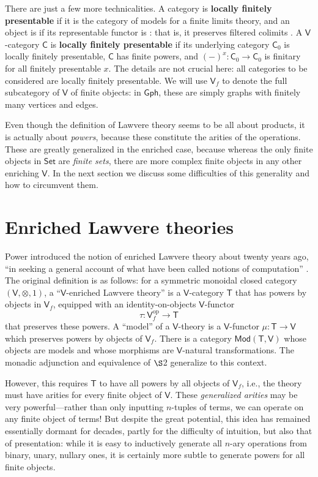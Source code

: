 \documentclass{amsart}
\newcommand{\define}[1]{{\bf \boldmath{#1}}}
\theoremstyle{definition}
\newcommand{\Gph}{\mathsf{Gph}}
\newcommand{\Set}{\mathsf{Set}}
\newcommand{\Mod}{\mathsf{Mod}}
\newcommand{\V}{\mathsf{V}}
\newcommand{\C}{\mathsf{C}}
\newcommand{\T}{\mathsf{T}}
\newcommand{\op}{\mathrm{op}}
\newcommand{\maps}{\colon}
\begin{document}
There are just a few more technicalities. A category is \textbf{locally finitely presentable} if it is the category of models for a finite limits theory, and an object is \define{finite} if its representable functor is \define{finitary}: that is, it preserves filtered colimits \cite{adamekrosicky}.   A $\V$-category $\C$ is \textbf{locally finitely presentable} if its underlying category $\C_0$ is locally finitely presentable, $\C$ has finite powers, and $(-)^x\maps \C_0 \to \C_0$ is finitary for all finitely presentable $x$.  The details are not crucial here: all categories to be considered are locally finitely presentable. We will use  $\V_f$ to denote the full subcategory of $\V$ of finite objects: in $\Gph$, these are simply graphs with finitely many vertices and edges.

Even though the definition of Lawvere theory seems to be all about products, it is actually about \textit{powers}, because these constitute the arities of the operations. These are greatly generalized in the enriched case, because whereas the only finite objects in $\Set$ are \textit{finite sets}, there are more complex finite objects in any other enriching $\V$.  In the next section we discuss some difficulties of this generality and how to circumvent them.

\section{Enriched Lawvere theories}

Power introduced the notion of enriched Lawvere theory about twenty years ago, ``in seeking a general account of what have been called notions of computation'' \cite{power}. The original definition is as follows: for a symmetric monoidal closed category $(\V,\otimes,1)$, a ``$\V$-enriched Lawvere theory'' is a $\V$-category $\T$ that has powers by objects in $\V_f$, equipped with an identity-on-objects $\V$-functor 
\[  \tau\maps\V_f^\op \to \T \]
that preserves these powers.  A ``model'' of a $\V$-theory is a $\V$-functor $\mu\maps\T \to \V$ which preserves powers by objects of $\V_f$.  There is a category $\Mod(\T,\V)$ whose objects are models and whose morphisms are $\V$-natural transformations. The monadic adjunction and equivalence of $\S$2 generalize to this context.

However, this requires $\T$ to have all powers by all objects of $\V_f$, i.e., the theory must have arities for every finite object of $\V$.  These \textit{generalized arities} may be very powerful---rather than only inputting $n$-tuples of terms, we can operate on any finite object of terms! But despite the great potential, this idea has remained essentially dormant for decades, partly for the difficulty of intuition, but also that of presentation: while it is easy to inductively generate all $n$-ary operations from binary, unary, nullary ones, it is certainly more subtle to generate powers for all finite objects.
\end{document}
